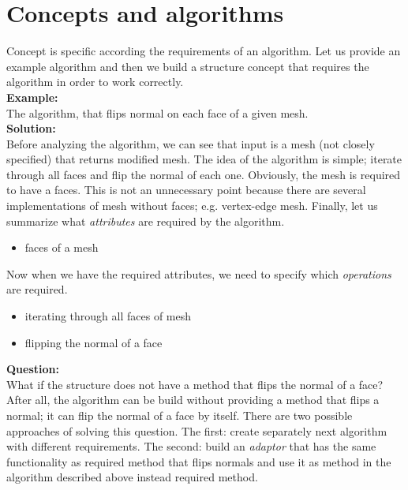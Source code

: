 \section{Concepts and algorithms}

Concept is specific according the requirements of an algorithm. Let us provide an example
algorithm and then we build a structure concept that requires the algorithm in order to work 
correctly.\\

\textbf{Example:}\\
The algorithm, that flips normal on each face of a given mesh.\\

\textbf{Solution:}\\
Before analyzing the algorithm, we can see that input is a mesh (not closely specified)
that returns modified mesh. The idea of the algorithm is simple; iterate through all faces
and flip the normal of each one. Obviously, the mesh is required to have a faces. This is not an
unnecessary point because there are several implementations of mesh without faces; e.g.
vertex-edge mesh. Finally, let us summarize what \emph{attributes} are required by the algorithm.

\begin{itemize}
\item faces of a mesh
\end{itemize}

Now when we have the required attributes, we need to specify which \emph{operations} are required.

\begin{itemize}
\item iterating through all faces of mesh
\item flipping the normal of a face 
\end{itemize}

\textbf{Question:}\\
What if the structure does not have a method that flips the normal of a face?\\

After all, the algorithm can be build without providing a method that flips a normal;
it can flip the normal of a face by itself.
There are two possible approaches of solving this question. The first: create separately
next algorithm with different requirements. The second: build an \emph{adaptor} that
has the same functionality as required method that flips normals and use it as method
in the algorithm described above instead required method.\\

